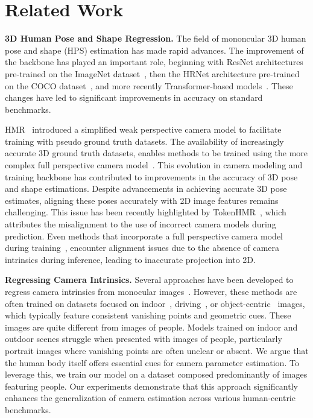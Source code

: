 \section{Related Work}
\label{sec:relatedwork}

\noindent\textbf{3D Human Pose and Shape Regression.}
The field of mononcular 3D human pose and shape (HPS) estimation has made rapid advances. 
The improvement of the backbone has played an important role, beginning with   ResNet architectures pre-trained on the ImageNet dataset~\cite{Kanazawa2018_hmr,spin,eft}, then the HRNet architecture pre-trained on the COCO dataset~\cite{hybrik,pymaf,pixie,expose},  and more recently  Transformer-based models~\cite{hmr2,refit,tokenhmr}.
These changes have led to significant improvements in accuracy on standard benchmarks.

HMR~\cite{Kanazawa2018_hmr} introduced a simplified weak perspective camera model to facilitate training with pseudo ground truth datasets. 
The availability of increasingly accurate 3D ground truth datasets, enables methods to be trained using the more complex full perspective camera model~\cite{beyondwp,li2022cliff,bedlam}. 
This evolution in camera modeling and training backbone has contributed to improvements in the accuracy of 3D pose and shape estimations. Despite advancements in achieving accurate 3D pose estimates, aligning these poses accurately with 2D image features remains challenging. 
This issue has been recently highlighted by TokenHMR~\cite{tokenhmr}, which attributes the misalignment to the use of incorrect camera models during prediction. 
Even methods that incorporate a full perspective camera model during training~\cite{li2022cliff,refit,beyondwp}, encounter alignment issues due to the absence of camera intrinsics during inference, leading to inaccurate projection into 2D. 

\noindent\textbf{Regressing Camera Intrinsics.}
Several approaches have been developed to regress camera intrinsics from monocular images~\cite{wildcamera,perspectivefields,ctrlc,spec}. However, these methods are often trained on datasets focused on indoor~\cite{sun3d,nyuv2}, driving~\cite{gsv,kitti}, or object-centric~\cite{objectron} images, which typically feature consistent vanishing points and geometric cues. 
These images are quite different from images of people.
Models trained on indoor and outdoor scenes struggle when presented with  images of people, particularly portrait images where vanishing points are often unclear or absent.
 We argue that the human body itself offers essential cues for camera parameter estimation. To leverage this, we train our model on a dataset composed predominantly of images featuring people. Our experiments demonstrate that this approach significantly enhances the generalization of camera estimation across various human-centric benchmarks.
